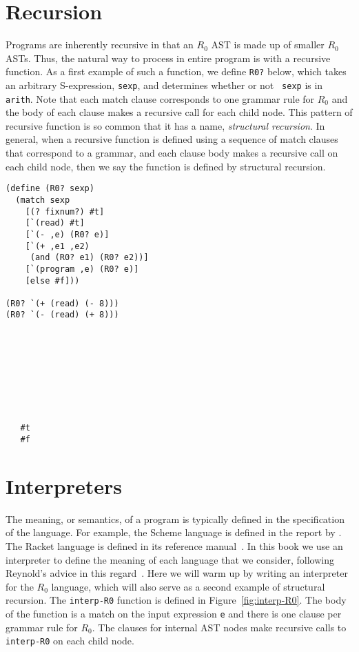 \documentclass[11pt]{book}
\begin{document}
\section{Recursion}
\label{sec:recursion}

Programs are inherently recursive in that an $R_0$ AST is made
up of smaller $R_0$ ASTs. Thus, the natural way to process in
entire program is with a recursive function.  As a first example of
such a function, we define \texttt{R0?} below, which takes an
arbitrary S-expression, {\tt sexp}, and determines whether or not {\tt
  sexp} is in {\tt arith}. Note that each match clause corresponds to
one grammar rule for $R_0$ and the body of each clause makes a
recursive call for each child node. This pattern of recursive function
is so common that it has a name, \emph{structural recursion}.  In
general, when a recursive function is defined using a sequence of
match clauses that correspond to a grammar, and each clause body makes
a recursive call on each child node, then we say the function is
defined by structural recursion.
\begin{center}
\begin{minipage}{0.7\textwidth}
\begin{lstlisting}
(define (R0? sexp)
  (match sexp
    [(? fixnum?) #t]
    [`(read) #t]
    [`(- ,e) (R0? e)]
    [`(+ ,e1 ,e2)
     (and (R0? e1) (R0? e2))]
    [`(program ,e) (R0? e)]
    [else #f]))

(R0? `(+ (read) (- 8)))
(R0? `(- (read) (+ 8)))
\end{lstlisting}
\end{minipage}
\vrule
\begin{minipage}{0.25\textwidth}
\begin{lstlisting}








   #t
   #f
\end{lstlisting}
\end{minipage}
\end{center}



\section{Interpreters}
\label{sec:interp-R0}

The meaning, or semantics, of a program is typically defined in the
specification of the language. For example, the Scheme language is
defined in the report by \cite{SPERBER:2009aa}. The Racket language is
defined in its reference manual~\citep{plt-tr}. In this book we use an
interpreter to define the meaning of each language that we consider,
following Reynold's advice in this
regard~\citep{reynolds72:_def_interp}. Here we will warm up by writing
an interpreter for the $R_0$ language, which will also serve
as a second example of structural recursion. The \texttt{interp-R0}
function is defined in Figure~\ref{fig:interp-R0}. The body of the
function is a match on the input expression \texttt{e} and there is
one clause per grammar rule for $R_0$. The clauses for
internal AST nodes make recursive calls to \texttt{interp-R0} on
each child node.
\end{document}

